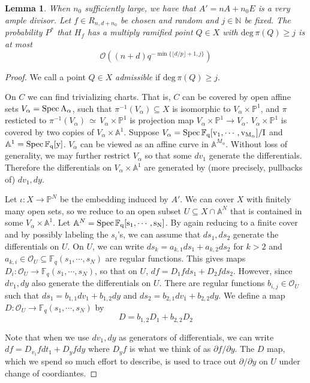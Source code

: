 \documentclass[12pt]{article}
\theoremstyle{plain}
\newtheorem{lemma}[equation]{Lemma}
\theoremstyle{definition}
\newcommand{\IA}{\mathbb{A}}
\newcommand{\IN}{\mathbb{N}}
\newcommand{\IF}{\mathbb{F}}
\newcommand{\IP}{\mathbb{P}}
\newcommand{\sO}{\mathcal{O}}
\renewcommand{\deg}{\mathrm{deg}\,}
\newcommand{\Spec}{\rm Spec\,}
\newcommand\iso{{\, \simeq \,}}
\newcommand{\<}{\langle}
\renewcommand{\>}{\rangle}
\newcommand{\p}{\partial}
\begin{document}
\begin{lemma}
\label{Decoup}
When $n_0$ sufficiently large, we have that $A' = nA + n_0 E$ is a very ample divisor. Let $f \in R_{n, d+n_0}$ be chosen and random and $j \in \IN$ be fixed. The probability $P^*$ that $H_f$ has a multiply ramified point $Q \in X$ with $\deg \pi(Q) \ge j$ is at most
$$ \sO((n + d)q^{- \min\{ \lfloor d/p \rfloor + 1, j    \}})$$
\end{lemma}
\begin{proof}
We call a point $Q \in X$ \textit{admissible} if $\deg \pi(Q) \ge j$. 


On $C$ we can find trivializing charts. That is, $C$ can be covered by open affine sets $V_\alpha = \Spec A_\alpha$, such that $\pi^{-1}(V_\alpha) \subseteq X$ is isomorphic to $V_\alpha \times \IP^1$, and $\pi$ resticted to $\pi^{-1}(V_\alpha) \iso V_\alpha \times \IP^1$ is projection map $V_\alpha \times \IP^1 \to V_\alpha$. 
$V_\alpha \times \IP^1$ is covered by two copies of $V_\alpha \times \IA^1$.  Suppose $V_\alpha = \Spec \IF_q[v_1, \cdots, v_{M_\alpha}]/I$ and $\IA^1 = \Spec \IF_q[y]$. $V_\alpha$ can be viewed as an affine curve in $\IA^{M_\alpha}$. Without loss of generality, we may further restrict $V_\alpha$ so that some $d v_1$ generate the differentials. Therefore the differentials on $V_\alpha \times \IA^1$ are generated by (more precisely, pullbacks of) $dv_1, dy$.  

Let $\iota : X \to \IP^N$ be the embedding induced by $A'$. We can cover $X$ with finitely many open sets, so we reduce to an open subset $U \subseteq X \cap \IA^N$ that is contained in some $V_\alpha \times \IA^1$. Let $\IA^N = \Spec \IF_q[s_1, \cdots, s_N]$. By again reducing to a finite cover and by possibly labeling the $s_i$'s, we can assume that $ds_1, ds_2$ generate the differentials on $U$. On $U$, we can write $ds_k = a_{k, 1} ds_1 + a_{k, 2} ds_2$ for $k > 2$ and $a_{k, i} \in \sO_U \subseteq \IF_q(s_1, \cdots, s_N)$ are regular functions. This gives maps $D_i : \sO_U \to \IF_q(s_1, \cdots, s_N)$, so that on $U$, $df = D_1 f ds_1 + D_2 f ds_2$. However, since $d v_1, dy$ also generate the differentials on $U$. There are regular functions $b_{i,j} \in \sO_U$ such that $ds_1 = b_{1, 1} dv_1 + b_{1, 2} dy$ and $ds_2 = b_{2, 1} dv_1 + b_{2, 2} dy$. We define a map $D : \sO_U \to \IF_q(s_1, \cdots, s_N)$ by 
$$ D = b_{1, 2} D_1 + b_{2,2} D_2$$

Note that when we use $dv_1, dy$ as generators of differentials, we can write $df = D_{v_1}f dt_1 + D_y f dy$ where $D_y f$ is what we think of as $\p f / \p y$. The $D$ map, which we spend so much effort to describe, is used to trace out $\p / \p y$ on $U$ under change of coordiantes. 


\end{proof}
\end{document}
